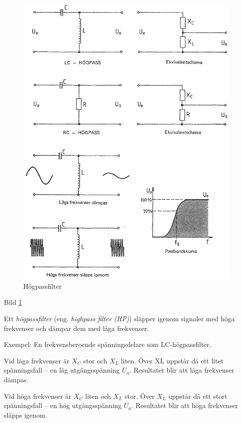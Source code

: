 \begin{figure}
\includegraphics[width=\textwidth]{images/cropped_pdfs/bild_2_3-22.pdf}
\caption{Högpassfilter}
\label{fig:BildII3-22}
\end{figure}

Bild \ref{fig:BildII3-22}

Ett \emph{högpassfilter} (eng. \emph{highpass filter (HP)}) släpper igenom
signaler med höga frekvenser och dämpar dem med låga frekvenser.

Exempel: En frekvensberoende spänningsdelare som LC-högpassfilter.

Vid låga frekvenser är \(X_C\) stor och \(X_L\) liten. Över XL uppstår då ett
litet spänningsfall -- en låg utgångsspänning \(U_a\). Resultatet blir att
låga frekvenser dämpas.

Vid höga frekvenser är \(X_C\) liten och \(X_L\) stor. Över \(X_L\) uppstår då
ett stort spänningsfall -- en hög utgångsspänning \(U_a\). Resultatet blir att
höga frekvenser släpps igenom.

